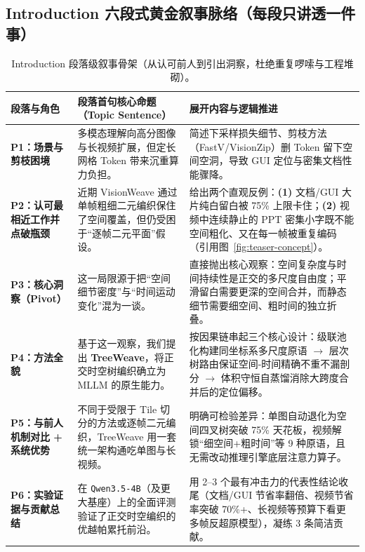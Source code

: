 \documentclass[11pt,a4paper]{ctexart}
\begin{document}
\subsection{Introduction 六段式黄金叙事脉络（每段只讲透一件事）}

\begin{table}[H]
\centering
\footnotesize
\setlength{\tabcolsep}{6pt}
\caption{Introduction 段落级叙事骨架（从认可前人到引出洞察，杜绝重复啰嗦与工程堆砌）。}
\label{tab:intro-arc}
\begin{tabularx}{\linewidth}{@{}p{2.3cm} p{4.2cm} >{\raggedright\arraybackslash}X@{}}
\toprule
\textbf{段落与角色} & \textbf{段落首句核心命题（Topic Sentence）} & \textbf{展开内容与逻辑推进} \\
\midrule
\textbf{P1：场景与剪枝困境} & 多模态理解向高分图像与长视频扩展，但定长网格 Token 带来沉重算力负担。 & 简述下采样损失细节、剪枝方法（FastV/VisionZip）删 Token 留下空间空洞，导致 GUI 定位与密集文档性能骤降。 \\
\textbf{P2：认可最相近工作并点破瓶颈} & 近期 VisionWeave 通过单帧粗细二元编织保住了空间覆盖，但仍受困于``逐帧二元平面''假设。 & 给出两个直观反例：\textbf{(1)} 文档/GUI 大片纯白留白被 75\% 上限卡住；\textbf{(2)} 视频中连续静止的 PPT 密集小字既不能空间粗化、又在每一帧被重复编码（引用图~\ref{fig:teaser-concept}）。 \\
\textbf{P3：核心洞察（Pivot）} & 这一局限源于把``空间细节密度''与``时间运动变化''混为一谈。 & 直接抛出核心观察：空间复杂度与时间持续性是正交的多尺度自由度；平滑留白需要更深的空间合并，而静态细节需要细空间、粗时间的独立折叠。 \\
\textbf{P4：方法全貌} & 基于这一观察，我们提出 \textbf{TreeWeave}，将正交时空树编织确立为 MLLM 的原生能力。 & 按因果链串起三个核心设计：级联池化构建同坐标系多尺度原语 $\to$ 层次树路由保证空间-时间精确不重不漏剖分 $\to$ 体积守恒自蒸馏消除大跨度合并后的定位偏移。 \\
\textbf{P5：与前人机制对比 + 系统优势} & 不同于受限于 Tile 切分的方法或逐帧二元编织，TreeWeave 用一套统一架构通吃单图与长视频。 & 明确可检验差异：单图自动退化为空间四叉树突破 75\% 天花板，视频解锁``细空间+粗时间''等 9 种原语，且无需改动推理引擎底层注意力算子。 \\
\textbf{P6：实验证据与贡献总结} & 在 \texttt{Qwen3.5-4B}（及更大基座）上的全面评测验证了正交时空编织的优越帕累托前沿。 & 用 2--3 个最有冲击力的代表性结论收尾（文档/GUI 节省率翻倍、视频节省率突破 70\%+、长视频等预算下看更多帧反超原模型），凝练 3 条简洁贡献。 \\
\bottomrule
\end{tabularx}
\end{table}
\end{document}

